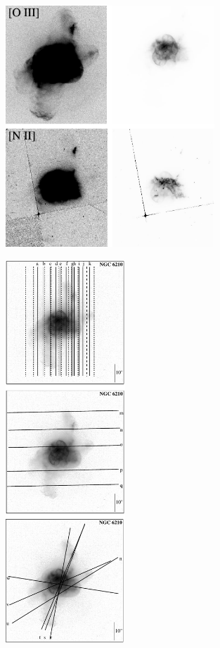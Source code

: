 \documentclass[useAMS, usenatbib]{mnras}
\makeatletter
\newcounter{ionstage}
\renewcommand{\ion}[2]{\setcounter{ionstage}{#2}%
  \ensuremath{\mathrm{#1\,\scriptstyle\Roman{ionstage}}}}
\newcommand\OIIIlam{[\ion{O}{3}]\,5007\,\AA\@}
\makeatother
\begin{document}

\begin{figure}[!t]
\centering
  \includegraphics[width=0.7\textwidth]{Figure1.pdf}
  \caption{ }
\end{figure}

\begin{figure}[!t]
\centering
  \includegraphics[width=0.4\textwidth]{Figure2a.pdf}
  \caption{ }
\end{figure}
\end{document}

